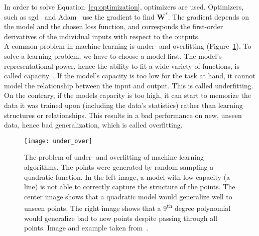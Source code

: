 In order to solve Equation~\ref{eq:optimization}, optimizers are used. Optimizers, such as \gls{sgd}~\cite{Goodfellow2016DeepLearning} and Adam~\cite{Kingma2014Adam:Optimization} use the gradient to find $\textbf{W}^*$. The gradient depends on the model and the chosen loss function, and corresponds the first-order derivatives of the individual inputs with respect to the outputs.\\

A common problem in machine learning is under- and overfitting (Figure~\ref{fig:under_over_fitting}). To solve a learning problem, we have to choose a model first. The model's representational power, hence the ability to fit a wide variety of functions, is called capacity~\cite{Goodfellow2016DeepLearning}. If the model's capacity is too low for the task at hand, it cannot model the relationship between the input and output. This is called underfitting. On the contrary, if the models capacity is too high, it can start to memorize the data it was trained upon (including the data's statistics) rather than learning structures or relationships. This results in a bad performance on new, unseen data, hence bad generalization, which is called overfitting.

\begin{figure}[htbp]
    \centering
	\texttt{[image: under\_over]}
    \caption[Under- and Overfitting]{The problem of under- and overfitting of machine learning algorithms. The points were generated by random sampling a quadratic function. In the left image, a model with low capacity (a line) is not able to correctly capture the structure of the points. The center image shows that a quadratic model would generalize well to unseen points. The right image shows that a 9\textsuperscript{th} degree polynomial would generalize bad to new points despite passing through all points. Image and example taken from~\cite{Goodfellow2016DeepLearning}.}
    \label{fig:under_over_fitting}
\end{figure}


